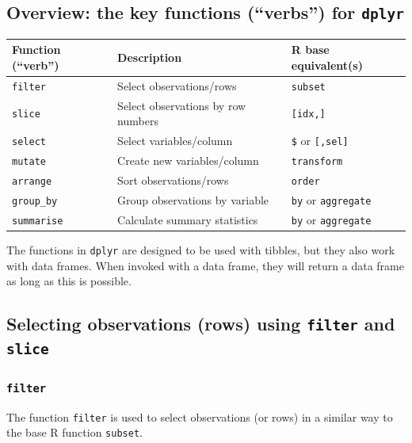 \documentclass[
]{book}
\begin{document}
\hypertarget{overview-the-key-functions-verbs-for-dplyr}{%
\subsection{\texorpdfstring{Overview: the key functions (``verbs'') for \texttt{dplyr}}{Overview: the key functions (``verbs'') for dplyr}}\label{overview-the-key-functions-verbs-for-dplyr}}

\begin{longtable}[]{@{}lll@{}}
\toprule()
Function (``verb'') & Description & R base equivalent(s) \\
\midrule()
\endhead
\texttt{filter} & Select observations/rows & \texttt{subset} \\
\texttt{slice} & Select observations by row numbers & \texttt{{[}idx,{]}} \\
\texttt{select} & Select variables/column & \texttt{\$} or \texttt{{[},sel{]}} \\
\texttt{mutate} & Create new variables/column & \texttt{transform} \\
\texttt{arrange} & Sort observations/rows & \texttt{order} \\
\texttt{group\_by} & Group observations by variable & \texttt{by} or \texttt{aggregate} \\
\texttt{summarise} & Calculate summary statistics & \texttt{by} or \texttt{aggregate} \\
\bottomrule()
\end{longtable}

The functions in \texttt{dplyr} are designed to be used with tibbles, but they also work with data frames. When invoked with a data frame, they will return a data frame as long as this is possible.

\hypertarget{selecting-observations-rows-using-filter-and-slice}{%
\subsection{\texorpdfstring{Selecting observations (rows) using \texttt{filter} and \texttt{slice}}{Selecting observations (rows) using filter and slice}}\label{selecting-observations-rows-using-filter-and-slice}}

\hypertarget{filter}{%
\subsubsection{\texorpdfstring{\texttt{filter}}{filter}}\label{filter}}

The function \texttt{filter} is used to select observations (or rows) in a similar way to the base R function \texttt{subset}.
\end{document}
